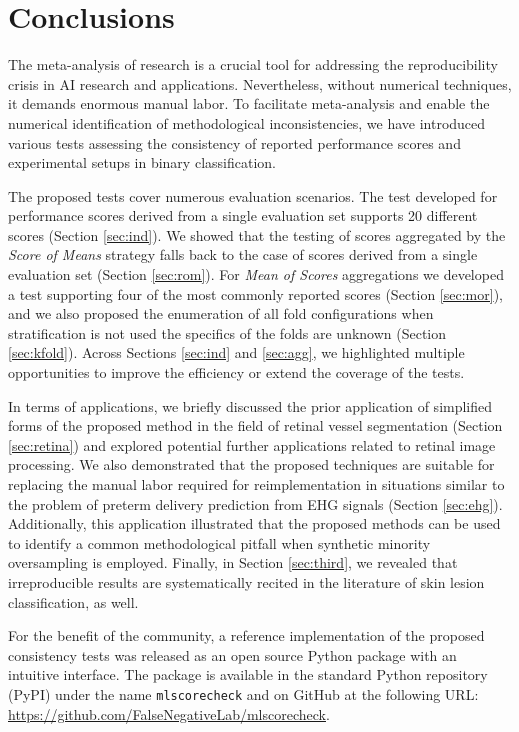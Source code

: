\documentclass[5p, final]{elsarticle}
\begin{document}
\section{Conclusions}
\label{sec:conclusions}

The meta-analysis of research is a crucial tool for addressing the reproducibility crisis in AI research and applications. Nevertheless, without numerical techniques, it demands enormous manual labor. To facilitate meta-analysis and enable the numerical identification of methodological inconsistencies, we have introduced various tests assessing the consistency of reported performance scores and experimental setups in binary classification. 

The proposed tests cover numerous evaluation scenarios. The test developed for performance scores derived from a single evaluation set supports 20 different scores (Section \ref{sec:ind}). We showed that the testing of scores aggregated by the \emph{Score of Means} strategy falls back to the case of scores derived from a single evaluation set (Section \ref{sec:rom}). For \emph{Mean of Scores} aggregations we developed a test supporting four of the most commonly reported scores (Section \ref{sec:mor}), and we also proposed the enumeration of all fold configurations when stratification is not used the specifics of the folds are unknown (Section \ref{sec:kfold}). Across Sections \ref{sec:ind} and \ref{sec:agg}, we highlighted multiple opportunities to improve the efficiency or extend the coverage of the tests.

In terms of applications, we briefly discussed the prior application of simplified forms of the proposed method in the field of retinal vessel segmentation (Section \ref{sec:retina}) and explored potential further applications related to retinal image processing. 
We also demonstrated that the proposed techniques are suitable for replacing the manual labor required for reimplementation in situations similar to the problem of preterm delivery prediction from EHG signals (Section \ref{sec:ehg}).
Additionally, this application illustrated that the proposed methods can be used to identify a common methodological pitfall when synthetic minority oversampling is employed.
Finally, in Section \ref{sec:third}, we revealed that irreproducible results are systematically recited in the literature of skin lesion classification, as well.

For the benefit of the community, a reference implementation of the proposed consistency tests was released as an open source Python package with an intuitive interface. The package is available in the standard Python repository (PyPI) under the name \verb|mlscorecheck| and on GitHub at the following URL: \url{https://github.com/FalseNegativeLab/mlscorecheck}.

% 



\end{document}
